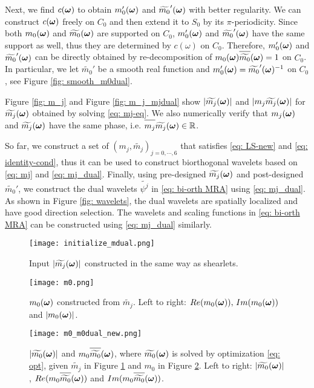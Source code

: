 Next, we find $c(\boldsymbol{\omega})$ to obtain $m_0'(\boldsymbol{\omega})$ and $\widetilde{m_0}'(\boldsymbol{\omega})$ with better regularity. We can construct $c(\boldsymbol{\omega})$ freely on $C_0$ and then extend it to $S_0$ by its $\pi$-periodicity. Since both $m_0(\boldsymbol{\omega})$ and $\widetilde{m_{0}}(\boldsymbol{\omega})$ are supported on $C_0$, $m_0'(\boldsymbol{\omega})$ and $\widetilde{m_0}'(\boldsymbol{\omega})$ have the same support as well, thus they are determined by $c(\omega)$ on $C_0$. Therefore, $m_0'(\boldsymbol{\omega})$ and $\widetilde{m_0}'(\boldsymbol{\omega})$ can be directly obtained by re-decomposition of $m_0(\V{\omega})\sbarm{0}=1$ on $C_0$. In particular, we let $\widetilde{m_0}'$ be a smooth real function and $m_0'(\boldsymbol{\omega}) = \widetilde{m_0}'(\boldsymbol{\omega})^{-1}$ on $C_0$, see Figure \ref{fig: smooth_m0dual}.

Figure \ref{fig: m_j} and Figure \ref{fig: m_j_mjdual} show $|\widetilde{m_{j}}(\boldsymbol{\omega})|$ and $|m_j\widetilde{m_{j}}(\boldsymbol{\omega})|$ for $\widetilde{m_{j}}(\boldsymbol{\omega})$ obtained by solving \eqref{eq: mj-eq}. We also numerically verify that $m_j(\boldsymbol{\omega})$ and $\widetilde{m_{j}}(\boldsymbol{\omega})$ have the same phase, i.e. $\overlinespace{m_j}\m{j}\in \mathbb{R}$.

So far, we construct a set of $(m_j,\widetilde{m_j})_{j = 0,\cdots,6}$ that satisfies \eqref{eq: LS-new} and \eqref{eq: identity-cond}, thus it can be used to construct biorthogonal wavelets based on \eqref{eq: mj} and \eqref{eq: mj_dual}. Finally, using pre-designed $\widetilde{m_{j}}(\boldsymbol{\omega})$ and post-designed $\widetilde{m_0}'$, we construct the dual wavelets  $\widetilde{\psi^j}$ in \eqref{eq: bi-orth MRA} using \eqref{eq: mj_dual}. As shown in Figure \ref{fig: wavelets}, the dual wavelets are spatially localized and have good direction selection. The wavelets and scaling functions in \eqref{eq: bi-orth MRA} can be constructed using \eqref{eq: mj_dual} similarly.

\begin{figure}
\centering
\texttt{[image: initialize\_mdual.png]}
\caption{ Input $|\widetilde{m_{j}}(\boldsymbol{\omega})|$ constructed in the same way as shearlets.}
\label{fig: mjdual}
\end{figure}

\begin{figure}
\centering
\texttt{[image: m0.png]}
\caption{ $m_0(\boldsymbol{\omega})$ constructed from $\widetilde{m_j}$. Left to right: $Re(m_0(\boldsymbol{\omega})),\, Im(m_0(\boldsymbol{\omega}))$ and $|m_0(\boldsymbol{\omega})|$.}
\label{fig: m_0}
\end{figure}

\begin{figure}
\centering
\texttt{[image: m0\_m0dual\_new.png]}
\caption{$|\widetilde{m_{0}}(\boldsymbol{\omega})|$ and $m_0\sbarm{0}$, where $\widetilde{m_{0}}(\boldsymbol{\omega})$ is solved by optimization \eqref{eq: opt}, given $\widetilde{m_j}$ in Figure \ref{fig: mjdual} and $m_0$ in Figure \ref{fig: m_0}. Left to right: $|\widetilde{m_{0}}(\boldsymbol{\omega})|$, $Re(m_0\sbarm{0})$ and $Im(m_0\sbarm{0})$. }
\label{fig: m_0_m0dual}
\end{figure}

